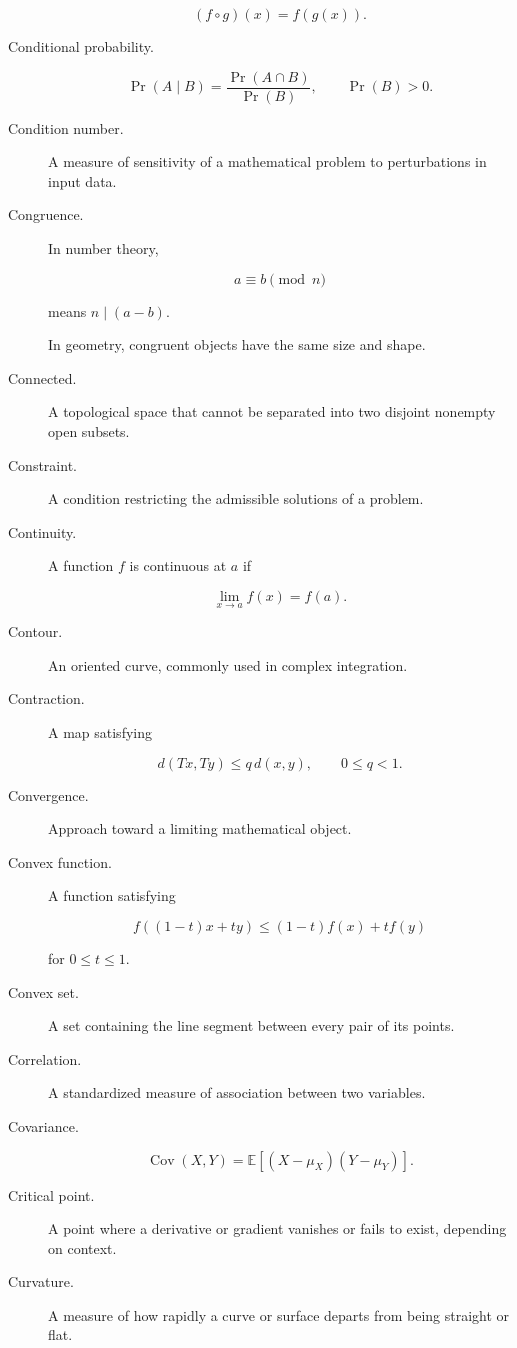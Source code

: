 \begin{description}
\[
(f\circ g)(x)
=
f(g(x)).
\]

\item[Conditional probability.]

\[
\Pr(A\mid B)
=
\frac{
\Pr(A\cap B)
}{
\Pr(B)
},
\qquad
\Pr(B)>0.
\]

\item[Condition number.]
A measure of sensitivity of a mathematical problem to perturbations in input
data.

\item[Congruence.]
In number theory,

\[
a\equiv b\pmod n
\]

means \(n\mid(a-b)\).

In geometry, congruent objects have the same size and shape.

\item[Connected.]
A topological space that cannot be separated into two disjoint nonempty open
subsets.

\item[Constraint.]
A condition restricting the admissible solutions of a problem.

\item[Continuity.]
A function \(f\) is continuous at \(a\) if

\[
\lim_{x\to a}f(x)
=
f(a).
\]

\item[Contour.]
An oriented curve, commonly used in complex integration.

\item[Contraction.]
A map satisfying

\[
d(Tx,Ty)
\leq
q\,d(x,y),
\qquad
0\leq q<1.
\]

\item[Convergence.]
Approach toward a limiting mathematical object.

\item[Convex function.]
A function satisfying

\[
f((1-t)x+ty)
\leq
(1-t)f(x)+tf(y)
\]

for \(0\leq t\leq1\).

\item[Convex set.]
A set containing the line segment between every pair of its points.

\item[Correlation.]
A standardized measure of association between two variables.

\item[Covariance.]

\[
\operatorname{Cov}(X,Y)
=
\mathbb{E}
[
(X-\mu_X)(Y-\mu_Y)
].
\]

\item[Critical point.]
A point where a derivative or gradient vanishes or fails to exist, depending
on context.

\item[Curvature.]
A measure of how rapidly a curve or surface departs from being straight or
flat.

\end{description}

